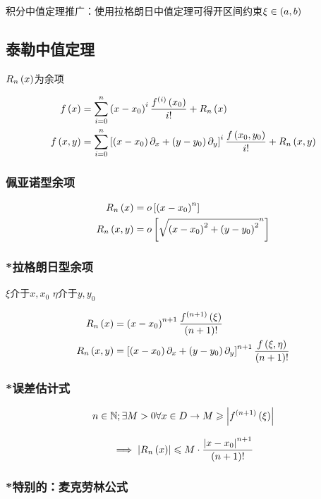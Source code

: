 \documentclass{article}
\begin{document}
积分中值定理推广：使用拉格朗日中值定理可得开区间约束$\xi\in\left(a,b\right)$

\subsection{泰勒中值定理}

$R_n\left(x\right)$为余项

\[\begin{aligned}
        f\left(x\right)   & =\sum_{i=0}^n\left(x-x_0\right)^i\frac{f^{\left(i\right)}\left(x_0\right)}{i!}+R_n\left(x\right)                                           \\
        f\left(x,y\right) & =\sum_{i=0}^n\left[\left(x-x_0\right)\partial_x+\left(y-y_0\right)\partial_y\right]^i\frac{f\left(x_0,y_0\right)}{i!}+R_n\left(x,y\right)\label{2}
    \end{aligned}\]

\subsubsection{佩亚诺型余项}

\[\begin{aligned}
        R_n\left(x\right)   & =
        o\left[\left(x-x_0\right)^n\right] \\
        R_n\left(x,y\right) & =
        o\left[\sqrt{\left(x-x_0\right)^2+\left(y-y_0\right)^2}^n\right]
    \end{aligned}\]

\subsubsection{*拉格朗日型余项\label{Lagrange}}

$\xi$介于$x,x_0$
$\eta$介于$y,y_0$

\[\begin{aligned}
        R_n\left(x\right)   & =
        \left(x-x_0\right)^{n+1}\frac{f^{\left(n+1\right)}\left(\xi\right)}{\left(n+1\right)!} \\
        R_n\left(x,y\right) & =
        \left[\left(x-x_0\right)\partial_x+\left(y-y_0\right)\partial_y\right]^{n+1}\frac{f\left(\xi,\eta\right)}{\left(n+1\right)!}
    \end{aligned}\]

\subsubsection{*误差估计式}

\[n\in\mathbb N;\exists M>0\forall x\in D\to M\geqslant\left|f^{\left(n+1\right)}\left(\xi\right)\right|\]

\[\implies\left|R_n\left(x\right)\right|\leqslant M\cdot\frac{\left|x-x_0\right|^{n+1}}{\left(n+1\right)!}\]

\subsubsection{*特别的：麦克劳林公式}
\end{document}
